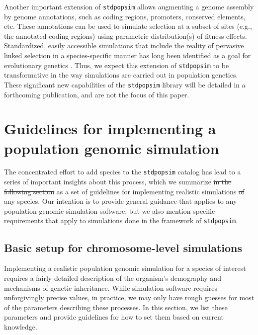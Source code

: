 \documentclass[hidelinks]{article}
\makeatletter
\newcommand{\stdpopsim}{\texttt{stdpopsim}\xspace}
\newcommand{\labelname}[1]{\def\@currentlabelname{#1}}
\providecommand{\DIFaddtex}[1]{{\protect\color{blue}\uwave{#1}}} %
\providecommand{\DIFdeltex}[1]{{\protect\color{red}\sout{#1}}}                      %
\providecommand{\DIFaddbegin}{} %
\providecommand{\DIFaddend}{} %
\providecommand{\DIFdelbegin}{} %
\providecommand{\DIFdelend}{} %
\providecommand{\DIFadd}[1]{\texorpdfstring{\DIFaddtex{#1}}{#1}} %
\providecommand{\DIFdel}[1]{\texorpdfstring{\DIFdeltex{#1}}{}} %
\newcommand{\DIFscaledelfig}{0.5}
\newlength{\DIFdelgraphicswidth} %
\newlength{\DIFdelgraphicsheight} %
\newcommand{\DIFaddincludegraphics}[2][]{{\color{blue}\fbox{\DIFOincludegraphics[#1]{#2}}}} %
\newcommand{\DIFdelincludegraphics}[2][]{%
\sbox{\DIFdelgraphicsbox}{\DIFOincludegraphics[#1]{#2}}%
\settoboxwidth{\DIFdelgraphicswidth}{\DIFdelgraphicsbox} %
\settoboxtotalheight{\DIFdelgraphicsheight}{\DIFdelgraphicsbox} %
\scalebox{\DIFscaledelfig}{%
\parbox[b]{\DIFdelgraphicswidth}{\usebox{\DIFdelgraphicsbox}\\[-\baselineskip] \rule{\DIFdelgraphicswidth}{0em}}\llap{\resizebox{\DIFdelgraphicswidth}{\DIFdelgraphicsheight}{%
\setlength{\unitlength}{\DIFdelgraphicswidth}%
\begin{picture}(1,1)%
\thicklines\linethickness{2pt} %
{\color[rgb]{1,0,0}\put(0,0){\framebox(1,1){}}}%
{\color[rgb]{1,0,0}\put(0,0){\line( 1,1){1}}}%
{\color[rgb]{1,0,0}\put(0,1){\line(1,-1){1}}}%
\end{picture}%
}\hspace*{3pt}}} %
} %
\DeclareRobustCommand{\DIFaddbegin}{\DIFOaddbegin \let\includegraphics\DIFaddincludegraphics} %
\DeclareRobustCommand{\DIFaddend}{\DIFOaddend \let\includegraphics\DIFOincludegraphics} %
\DeclareRobustCommand{\DIFdelbegin}{\DIFOdelbegin \let\includegraphics\DIFdelincludegraphics} %
\DeclareRobustCommand{\DIFdelend}{\DIFOaddend \let\includegraphics\DIFOincludegraphics} %
\makeatother
\begin{document}
Another important extension of \stdpopsim allows augmenting a genome assembly by genome annotations, such as coding regions, promoters, conserved elements, etc.
These annotations can be used to simulate selection at a subset of sites (e.g., the annotated coding regions)
using parametric distribution(s) of fitness effects.
Standardized, easily accessible simulations
that include the reality of pervasive linked selection in a species-specific
manner has long been identified as a goal for evolutionary genetics
\cite[e.g.,][]{McVicker2009,comeron2014background}.
Thus, we expect this extension of \stdpopsim to be transformative in the way simulations are carried out in population genetics.
These significant new capabilities of the \stdpopsim library will be detailed in a forthcoming publication,
and are not the focus of this paper.

\section*{Guidelines for implementing a population genomic simulation}
    \labelname{Guidelines}
    \label{sec:sim-guidelines}


The concentrated effort to add species to the \stdpopsim catalog
has lead to a series of important insights about this process,
which we summarize \DIFdelbegin \DIFdel{in the following section }\DIFdelend \DIFaddbegin \DIFadd{here }\DIFaddend as a set of guidelines
for implementing realistic simulations \DIFdelbegin \DIFdel{of }\DIFdelend \DIFaddbegin \DIFadd{for }\DIFaddend any species.
Our intention is to provide general guidance that applies to any population genomic simulation software,
but we also mention specific requirements that apply to simulations done in the framework of \stdpopsim.

\subsection*{Basic setup for chromosome-level simulations}

Implementing a realistic population genomic simulation for a species of interest
requires a fairly detailed description of the organism's demography and mechanisms of genetic inheritance.
While simulation software requires unforgivingly precise values,
in practice, we may only have rough guesses for most of  the parameters describing these processes.
In this section, we list these parameters and
provide guidelines for how to set them based on current knowledge.
\end{document}
